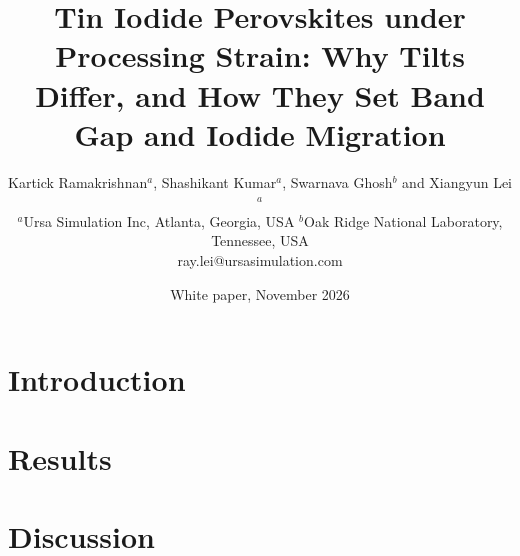 \documentclass[11pt]{article}
\title{\textbf{Tin Iodide Perovskites under Processing Strain: Why Tilts Differ, and How They Set Band Gap and Iodide Migration}}
\author{Kartick Ramakrishnan$^{a}$, Shashikant Kumar$^{a}$, Swarnava Ghosh$^{b}$ and Xiangyun Lei$^{a}$\\[2pt]
  \small $^{a}$Ursa Simulation Inc, Atlanta, Georgia, USA \quad $^{b}$Oak Ridge National Laboratory, Tennessee, USA\\
  \small ray.lei@ursasimulation.com}
\date{White paper, November 2026}
\begin{document}
\maketitle
\thispagestyle{empty}
\vspace*{-20pt}

\clearpage
\setcounter{page}{1}

\section{Introduction}


\section{Results}


\section{Discussion}



\end{document}
